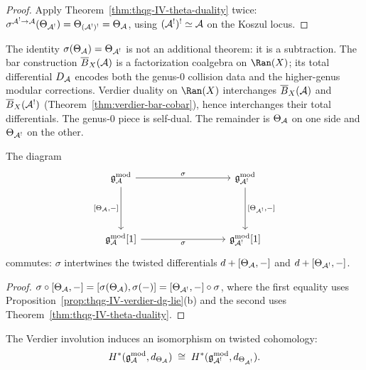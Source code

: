 \begin{proof}
Apply Theorem~\ref{thm:thqg-IV-theta-duality} twice:
$\sigma^{\mathcal{A}^! \to \mathcal{A}}(\Theta_{\mathcal{A}^!})
= \Theta_{(\mathcal{A}^!)^!} = \Theta_{\mathcal{A}}$,
using $(\mathcal{A}^!)^! \simeq \mathcal{A}$ on the Koszul locus.
\end{proof}

\begin{remark}[Inevitability]
\label{rem:thqg-IV-inevitability}
The identity $\sigma(\Theta_{\mathcal{A}}) = \Theta_{\mathcal{A}^!}$ is not an additional
theorem: it is a subtraction. The bar construction
$\overline{B}_X(\mathcal{A})$ is a factorization coalgebra on $\Ran(X)$; its total
differential $D_{\mathcal{A}}$ encodes both the genus-$0$ collision data and the
higher-genus modular corrections. Verdier duality on $\Ran(X)$
interchanges $\overline{B}_X(\mathcal{A})$ and $\overline{B}_X(\mathcal{A}^!)$
(Theorem~\ref{thm:verdier-bar-cobar}), hence interchanges their total
differentials. The genus-$0$ piece is self-dual. The remainder is
$\Theta_{\mathcal{A}}$ on one side and $\Theta_{\mathcal{A}^!}$ on the other.
\end{remark}

\begin{proposition}
\label{prop:thqg-IV-fundamental-diagram}
The diagram
\begin{equation}\label{eq:thqg-IV-fundamental-diagram}
\begin{tikzcd}[column sep=3cm, row sep=1.5cm]
\gAmod \arrow[r, "\sigma"] \arrow[d, "{[\Theta_\cA, -]}"']
& \mathfrak{g}_{\cA^!}^{\mathrm{mod}} \arrow[d, "{[\Theta_{\cA^!}, -]}"] \\
\gAmod{}[1] \arrow[r, "\sigma"']
& \mathfrak{g}_{\cA^!}^{\mathrm{mod}}[1]
\end{tikzcd}
\end{equation}
commutes: $\sigma$ intertwines the twisted differentials
$d + [\Theta_{\mathcal{A}}, -]$ and $d + [\Theta_{\mathcal{A}^!}, -]$.
\end{proposition}

\begin{proof}
$\sigma \circ [\Theta_{\mathcal{A}}, -]
= [\sigma(\Theta_{\mathcal{A}}), \sigma(-)]
= [\Theta_{\mathcal{A}^!}, -] \circ \sigma$,
where the first equality uses Proposition~\ref{prop:thqg-IV-verdier-dg-lie}(b)
and the second uses Theorem~\ref{thm:thqg-IV-theta-duality}.
\end{proof}

\begin{corollary}
\label{cor:thqg-IV-twisted-tangent}
The Verdier involution induces an isomorphism on twisted cohomology:
\[
H^*(\mathfrak{g}_{\mathcal{A}}^{\mathrm{mod}}, d_{\Theta_{\mathcal{A}}}) \;\cong\;
H^*(\mathfrak{g}_{\mathcal{A}^!}^{\mathrm{mod}}, d_{\Theta_{\mathcal{A}^!}}).
\]
\end{corollary}

